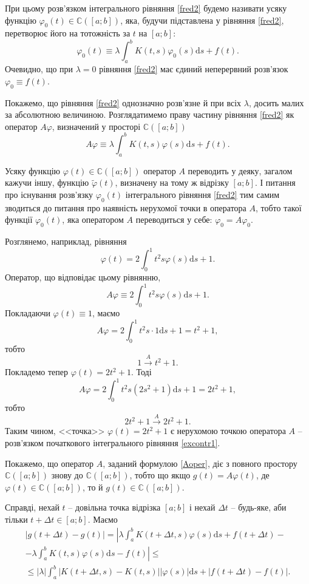 \documentclass[14pt,twoside]{extreport}
\theoremstyle{mystyle}
\numberwithin{equation}{chapter}
\newcommand{\cab}{\mathbb{C}([a; b])}
\begin{document}
При цьому розв'язком інтегрального рівняння \eqref{fred2} будемо називати усяку функцію $\varphi_0(t) \in \cab$, яка, будучи підставлена у рівняння \eqref{fred2}, перетворює його на тотожність за $t$ на $[a; b]$:
\begin{equation}\label{fredsol}
 \varphi_0(t) \equiv \lambda \int_{a}^{b} K(t, s) \varphi_0(s) \mathrm{d} s + f(t).
\end{equation}
Очевидно, що при $\lambda = 0$ рівняння \eqref{fred2} має єдиний неперервний розв'язок $\varphi_0 \equiv f(t)$.

Покажемо, що рівняння \eqref{fred2} однозначно розв'язне й при всіх $\lambda$, досить малих за абсолютною величиною. Розглядатимемо праву частину рівняння \eqref{fred2} як оператор $A\varphi$, визначений у просторі $\cab$
\begin{equation}\label{Aoper}
 A\varphi \equiv \lambda \int_{a}^{b} K(t, s) \varphi(s) \mathrm{d} s + f(t).
\end{equation}

Усяку функцію $\varphi(t) \in \cab$ оператор $A$ переводить у деяку, загалом кажучи іншу, функцію $\tilde{\varphi}(t)$, визначену на тому ж відрізку $[a; b]$. І питання про існування розв'язку $\varphi_0(t)$ інтегрального рівняння \eqref{fred2} тим самим зводиться до питання про наявність нерухомої точки в оператора $A$, тобто такої функції $\varphi_0(t)$, яка оператором $A$ переводиться у себе: $\varphi_0 = A\varphi_0$.

Розглянемо, наприклад, рівняння
\begin{equation}\label{excontr1}
 \varphi(t) = 2\int_0^1t^2s\varphi(s) \mathrm{d}s +1.
\end{equation}
Оператор, що відповідає цьому рівнянню,
\[
 A\varphi \equiv 2\int_0^1t^2s\varphi(s) \mathrm{d}s +1.
\]
Покладаючи $\varphi(t) \equiv 1$, маємо
\[
 A\varphi = 2\int_0^1t^2s\cdot 1 \mathrm{d}s +1 = t^2+1,
\]
тобто
\[
 1 \xrightarrow{A} t^2+1.
\]
Покладемо тепер $\varphi(t) = 2t^2 + 1$. Тоді
\[
 A\varphi = 2\int_0^1t^2s(2s^2 + 1) \mathrm{d}s +1 = 2t^2 + 1,
\]
тобто
\[
 2t^2 + 1 \xrightarrow{A} 2t^2 + 1.
\]
Таким чином, <<точка>> $\varphi(t) = 2t^2 + 1$ є нерухомою точкою оператора $A$ -- розв'язком початкового інтегрального рівняння \eqref{excontr1}.

Покажемо, що оператор $A$, заданий формулою \eqref{Aoper}, діє з повного простору $\cab$ знову до $\cab$, тобто що якщо $g(t) = A\varphi(t)$, де $\varphi(t)\in \cab$, то й $g(t)\in \cab$.

Справді, нехай $t$ -- довільна точка відрізка $[a; b]$ і нехай $\Delta t$ -- будь-яке, аби тільки $t+\Delta t \in [a; b]$. Маємо
\begin{multline}\label{gdiff}
  |g(t+\Delta t) - g(t)|=\left| \lambda \int_{a}^{b} K(t+\Delta t, s)\varphi(s) \mathrm{d}s + f(t + \Delta t) -\right.\\
  \left. - \lambda \int_{a}^{b} K(t, s)\varphi(s) \mathrm{d}s - f(t)\right| \leqslant\\
  \leqslant |\lambda| \int_{a}^{b} |K(t+\Delta t, s) - K(t, s)| |\varphi(s)| \mathrm{d}s + |f(t + \Delta t) - f(t)|.
\end{multline}
\end{document}

